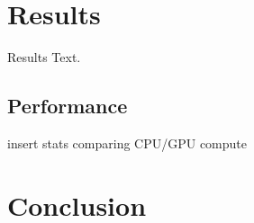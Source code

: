 \documentclass[]{acmsiggraph}
\begin{document}
\section{Results} \label{sec:results}
Results Text.

\subsection{Performance} \label{sec:performance}

insert stats comparing CPU/GPU compute

\section{Conclusion} \label{sec:conclusion}



\end{document}

